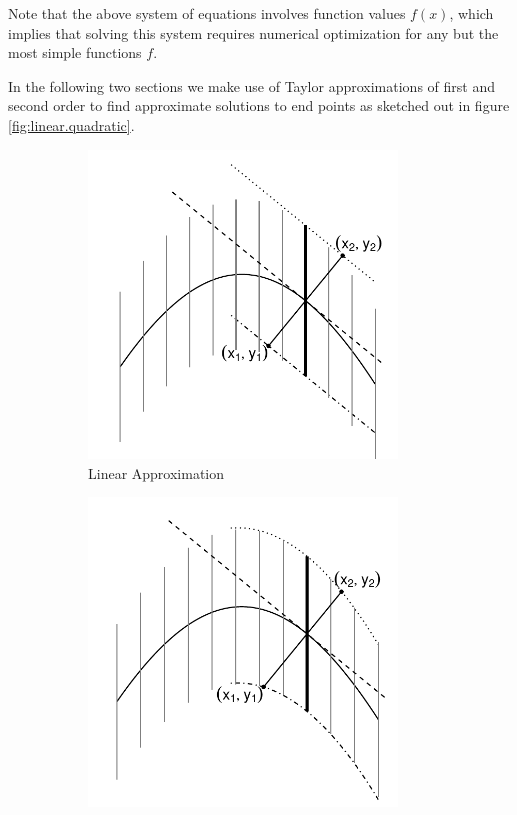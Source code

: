 \documentclass[11pt]{isuthesis}\usepackage[]{graphicx}\usepackage[]{color}
\begin{document}
Note that  the above system of equations involves function values $f(x)$, which implies that solving this system  requires numerical optimization for any but the most simple functions $f$.

In the following two sections we make use of Taylor approximations of first and second order to find approximate solutions to end points as sketched out in figure \ref{fig:linear.quadratic}.





\begin{figure}[h!]\centering
\begin{subfigure}[t]{0.4\textwidth}\centering
\includegraphics[keepaspectratio=TRUE,width=0.9\textwidth]{fig-generalcorrectioncartoon2}
\caption{Linear Approximation}\label{fig:linear-GeneralCorrection}
\end{subfigure}
\begin{subfigure}[t]{0.4\textwidth}\centering
\includegraphics[keepaspectratio=TRUE,width=0.9\textwidth]{fig-generalcorrectioncartoon3}

\end{subfigure}
\end{figure}
\end{document}
